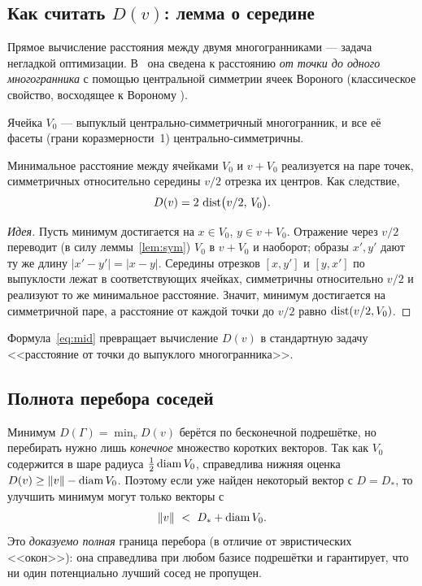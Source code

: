 \subsection{Как считать $D(v)$: лемма о середине}

Прямое вычисление расстояния между двумя многогранниками --- задача негладкой
оптимизации. В~\cite{Ivanov2011} она сведена к расстоянию \emph{от точки до
одного многогранника} с помощью центральной симметрии ячеек Вороного
(классическое свойство, восходящее к Вороному \cite{Voronoi}).

\begin{lemma}[Вороной]\label{lem:sym}
Ячейка $V_0$ --- выпуклый центрально-симметричный многогранник, и все её
фасеты (грани коразмерности~1) центрально-симметричны.
\end{lemma}

\begin{lemma}\label{lem:mid}
Минимальное расстояние между ячейками $V_0$ и $v+V_0$ реализуется на паре
точек, симметричных относительно середины $v/2$ отрезка их центров. Как
следствие,
\begin{equation}\label{eq:mid}
D(v)=2\,\operatorname{dist}\bigl(v/2,\,V_0\bigr).
\end{equation}
\end{lemma}
\begin{proof}[Идея]
Пусть минимум достигается на $x\in V_0$, $y\in v+V_0$. Отражение через $v/2$
переводит (в силу леммы~\ref{lem:sym}) $V_0$ в $v+V_0$ и наоборот; образы
$x',y'$ дают ту же длину $|x'-y'|=|x-y|$. Середины отрезков $[x,y']$ и $[y,x']$
по выпуклости лежат в соответствующих ячейках, симметричны относительно $v/2$ и
реализуют то же минимальное расстояние. Значит, минимум достигается на
симметричной паре, а расстояние от каждой точки до $v/2$ равно $\operatorname{dist}(v/2,V_0)$.
\end{proof}

Формула~\eqref{eq:mid} превращает вычисление $D(v)$ в стандартную задачу
<<расстояние от точки до выпуклого многогранника>>.

\subsection{Полнота перебора соседей}

Минимум $D(\Gamma)=\min_v D(v)$ берётся по бесконечной подрешётке, но
перебирать нужно лишь \emph{конечное} множество коротких векторов. Так как
$V_0$ содержится в шаре радиуса $\tfrac12\operatorname{diam} V_0$, справедлива нижняя оценка
$D(v)\ge\|v\|-\operatorname{diam} V_0$. Поэтому если уже найден некоторый вектор с $D=D_{*}$,
то улучшить минимум могут только векторы с
\begin{equation}\label{eq:window}
\|v\|\ <\ D_{*}+\operatorname{diam} V_0.
\end{equation}
Это \emph{доказуемо полная} граница перебора (в отличие от эвристических
<<окон>>): она справедлива при любом базисе подрешётки и гарантирует, что ни
один потенциально лучший сосед не пропущен.

